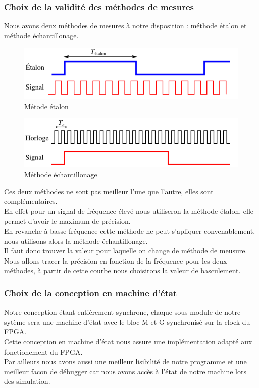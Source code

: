 \documentclass[a4paper,11pt]{article}
\begin{document}
\subsubsection{Choix de la validité des méthodes de mesures}
Nous avons deux méthodes de mesures à notre disposition : méthode étalon et méthode échantillonage.\\
\begin{figure}[H]
\begin{center}
	\includegraphics[scale=.5]{etalon.png}
	\caption{Métode étalon}
\end{center}
\end{figure}

\begin{figure}[H]
\begin{center}
	\includegraphics[scale=.5]{ech.png}
	\caption{Méthode échantillonage}
\end{center}
\end{figure}
Ces deux méthodes ne sont pas meilleur l'une que l'autre, elles sont complémentaires.\\
En effet pour un signal de fréquence élevé nous utiliseron la méthode étalon, elle permet d'avoir le maximum de précision.\\
En revanche à basse fréquence cette méthode ne peut s'apliquer convenablement, nous utilisons alors la méthode échantillonage.\\

Il faut donc trouver la valeur pour laquelle on change de méthode de meusure. Nous allons tracer la précision en fonction de la fréquence pour 
les deux méthodes, à partir de cette courbe nous choisirons la valeur de basculement.

\subsubsection{Choix de la conception en machine d'état}
Notre conception étant entièrement synchrone, chaque sous module de notre sytème sera une machine d'état avec le bloc M et G synchronisé sur
la clock du FPGA.\\
Cette conception en machine d'état nous assure une implémentation adapté aux fonctionement du FPGA.\\ 
Par ailleurs nous avons aussi une meilleur lisibilité de notre programme et une meilleur facon de débugger car nous avons accès à l'état de notre machine lors des simulation.\\
\newpage
\end{document}
